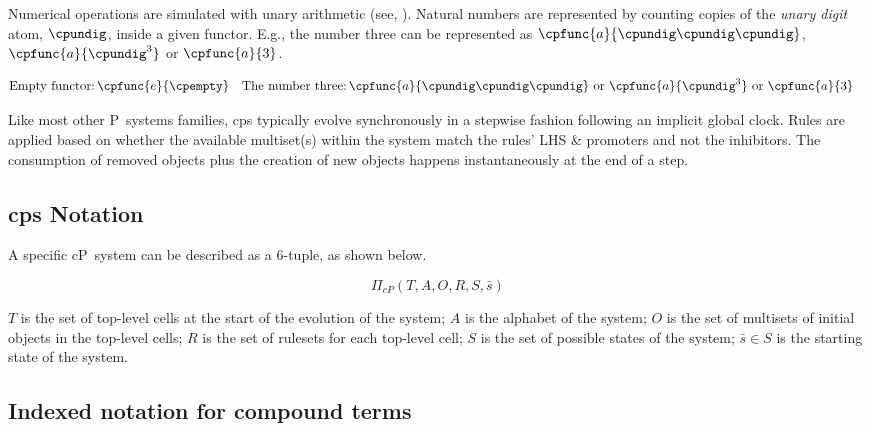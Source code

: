 Numerical operations are simulated with unary arithmetic (see, \eg{} \cite{Aman2019,Bonchis2006}).  Natural numbers are represented by counting copies of the \emph{unary digit} atom, \(\cpundig\), inside a given functor.  E.g., the number three can be represented as \(\cpfunc{a}{\cpundig\cpundig\cpundig}\), \(\cpfunc{a}{\cpundig^3}\) or \(\cpfunc{a}{3}\).

\begin{framed}
\vspace{-1.1cm}
    \begin{align*}
        \text{Empty functor:}&\, \cpfunc{e}{\cpempty} & \text{The number three:}&\, \cpfunc{a}{\cpundig\cpundig\cpundig} \text{ or } \cpfunc{a}{\cpundig^3} \text{ or } \cpfunc{a}{3}
    \end{align*}
\vspace{-0.8cm}
\end{framed}

Like most other P~systems families, \gls{cps} typically evolve synchronously in a stepwise fashion following an implicit global clock.  Rules are applied based on whether the available multiset(s) within the system match the rules' LHS \& promoters and not the inhibitors.  The consumption of removed objects plus the creation of new objects happens instantaneously at the end of a step.

\subsection{\label{sec:nmp:notation}\texorpdfstring{\gls{cps}}{cP systems} Notation}
A specific cP~system can be described as a 6-tuple, as shown below.

\begin{framed}
\vspace{-1.0cm}
\[
\Pi_{cP}(T, A, O, R, S, \bar{s})
\]
\vspace{-0.7cm}
\end{framed}

\(T\) is the set of top-level cells at the start of the evolution of the system; \(A\) is the alphabet of the system; \(O\) is the set of multisets of initial objects in the top-level cells; \(R\) is the set of \glspl{ruleset} for each top-level cell; \(S\) is the set of possible states of the system; \(\bar{s} \in S\) is the starting state of the system.

\subsection{\label{sec:nmp:compoundterms}Indexed notation for compound terms}

